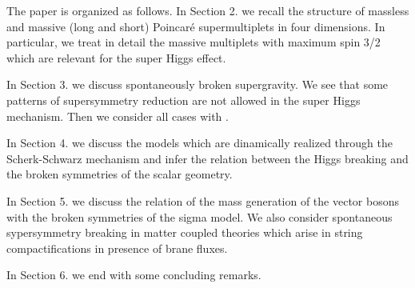 \documentclass[a4paper,12pt]{article}
\begin{document}
The paper is organized as follows. In Section 2. we recall  the structure of massless and massive
(long and short) Poincar\'e  supermultiplets in four dimensions. In particular, we treat in detail
the massive multiplets with maximum spin 3/2 which are relevant for the super Higgs effect.

In Section 3. we discuss spontaneously broken \coordHE{} supergravity. We see that some patterns of
supersymmetry reduction  \coordHE{} are not allowed in the super Higgs mechanism. Then we
consider all cases with \coordHE{}.

In Section 4. we discuss the models which are dinamically realized through the Scherk-Schwarz
mechanism and infer the relation between the Higgs breaking and the broken symmetries of the scalar
geometry.

In Section 5. we discuss the relation of the mass generation of the vector bosons with the broken
 symmetries of the sigma model. We also  consider spontaneous sypersymmetry breaking in matter
  coupled theories which arise in string  compactifications in presence of brane fluxes.

In Section 6. we end with some concluding remarks.
\end{document}
